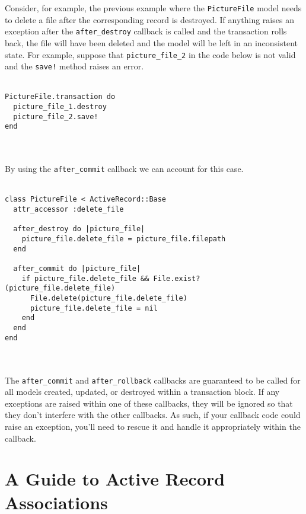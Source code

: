 \documentclass[10pt]{book}
\begin{document}
Consider, for example, the previous example where the \texttt{PictureFile} model needs to delete a file after the corresponding record is destroyed. If anything raises an exception after the \texttt{after\_destroy}  callback is called and the transaction rolls back, the file will have  been deleted and the model will be left in an inconsistent state. For  example, suppose that \texttt{picture\_file\_2} in the code below is not valid and the \texttt{save!} method raises an error.
\\ \\
\begin{minipage}{\textwidth}{\scriptsize
\begin{verbatim}
PictureFile.transaction do
  picture_file_1.destroy
  picture_file_2.save!
end
\end{verbatim}}
\end{minipage}
\\ \\

By using the \texttt{after\_commit} callback we can account for this case.
\\ \\
\begin{minipage}{\textwidth}{\scriptsize
\begin{verbatim}
class PictureFile < ActiveRecord::Base
  attr_accessor :delete_file
 
  after_destroy do |picture_file|
    picture_file.delete_file = picture_file.filepath
  end
 
  after_commit do |picture_file|
    if picture_file.delete_file && File.exist?(picture_file.delete_file)
      File.delete(picture_file.delete_file)
      picture_file.delete_file = nil
    end
  end
end
\end{verbatim}}
\end{minipage}
\\ \\

The \texttt{after\_commit} and \texttt{after\_rollback} callbacks are  guaranteed to be called for all models created, updated, or destroyed  within a transaction block. If any exceptions are raised within one of  these callbacks, they will be ignored so that they don’t interfere with  the other callbacks. As such, if your callback code could raise an  exception, you’ll need to rescue it and handle it appropriately within  the callback.    

\chapter{A Guide to Active Record Associations}
\end{document}
